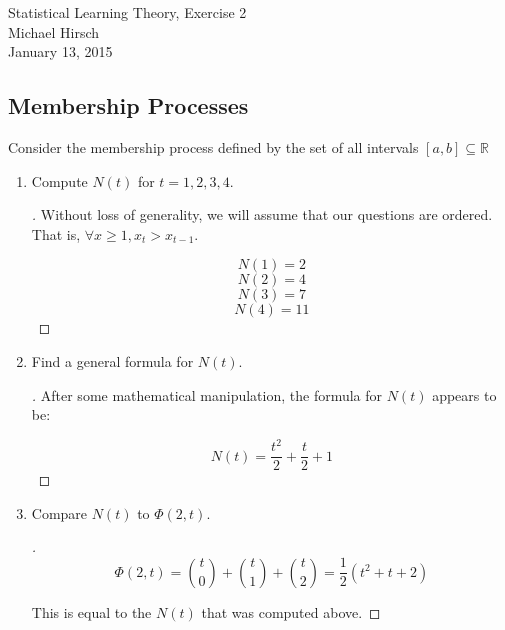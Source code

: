 \documentclass[]{book}
\theoremstyle{definition}
\begin{document}
\begin{center}
{\Large Statistical Learning Theory, Exercise 2}\\
Michael Hirsch\\ %
January 13, 2015 %
\end{center}

\vspace{0.2 cm}


\subsection*{Membership Processes}

Consider the membership process defined by the set of all intervals $[a, b] \subseteq \mathbb{R}$


\begin{enumerate}
\item\label{norms}

Compute $N(t)$ for $t = 1, 2, 3, 4$.

\begin{proof}[\unskip\nopunct]

Without loss of generality, we will assume that our questions are ordered. That is, $\forall x \geq 1, x_{t} > x_{t-1}$.

$$N(1) = 2$$
$$N(2) = 4$$
$$N(3) = 7$$
$$N(4) = 11$$



\end{proof}

\item

Find a general formula for $N(t)$.

\begin{proof}[\unskip\nopunct]

After some mathematical manipulation, the formula for $N(t)$ appears to be:

$$N(t) = \dfrac{t^{2}}{2} + \dfrac{t}{2} + 1 $$

\end{proof}

\item	

Compare $N(t)$ to $\Phi(2,t)$.

\begin{proof}[\unskip\nopunct]
		
$$\Phi(2,t) = {t \choose 0} + {t \choose 1} + {t \choose 2} = \dfrac{1}{2}(t^{2}+t+2) $$

This is equal to the $N(t)$ that was computed above.

\end{proof}

\end{enumerate}
\end{document}
